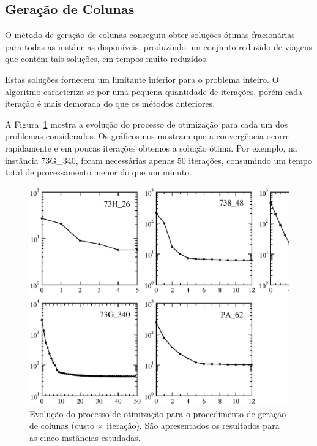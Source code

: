 
\subsection{Geração de Colunas}
\label{sec:resultados_cg}

O método de geração de colunas conseguiu obter soluções ótimas fracionárias para todas as instâncias
disponíveis, produzindo um conjunto reduzido de viagens que contém tais soluções, em tempos muito
reduzidos. 

Estas soluções fornecem um limitante inferior para o problema inteiro. O algoritmo
caracteriza-se por uma pequena quantidade de iterações, porém cada iteração é mais demorada do que
os métodos anteriores.

A Figura~\ref{fig:cg_results} mostra a evolução do processo de otimização para cada um dos problemas
considerados. Os gráficos nos mostram que a convergência ocorre rapidamente e em poucas
iterações obtemos a solução ótima. Por exemplo, na instância 73G\_340, foram necessárias apenas
50 iterações, consumindo um tempo total de processamento menor do que um minuto. 

\begin{figure}[htbp]
	\begin{center}
		\includegraphics[scale=0.5]{fig/cg_results.eps}
		\caption{Evolução do processo de otimização para o procedimento de geração de colunas (custo 
		$\times$ iteração). São apresentados os resultados para as cinco instâncias
		estudadas.}
		\label{fig:cg_results}
	\end{center}
\end{figure}

